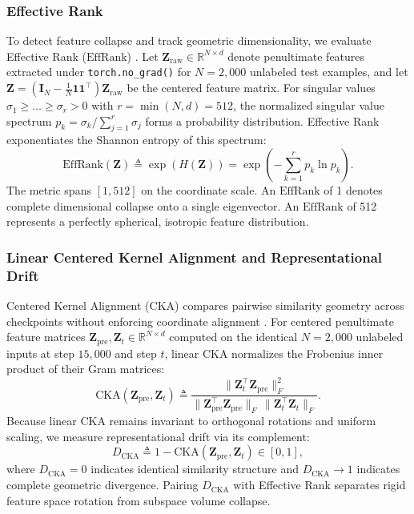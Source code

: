 \documentclass[sn-mathphys,Numbered]{sn-jnl}
\newcommand{\EffRank}{\mathrm{EffRank}}
\newcommand{\Dcka}{D_{\mathrm{CKA}}}
\begin{document}
\subsubsection{Effective Rank}\label{subsubsec:protocol_rank}
To detect feature collapse and track geometric dimensionality, we evaluate Effective Rank ($\EffRank$) \cite{roy2007effective,begga2026preserving}. Let $\bm{Z}_{\mathrm{raw}} \in \mathbb{R}^{N \times d}$ denote penultimate features extracted under \texttt{torch.no\_grad()} for $N = 2{,}000$ unlabeled test examples, and let $\bm{Z} = (\bm{I}_N - \frac{1}{N}\bm{1}\bm{1}^\top)\bm{Z}_{\mathrm{raw}}$ be the centered feature matrix. For singular values $\sigma_1 \ge \dots \ge \sigma_r > 0$ with $r = \min(N, d) = 512$, the normalized singular value spectrum $p_k = \sigma_k / \sum_{j=1}^r \sigma_j$ forms a probability distribution. Effective Rank exponentiates the Shannon entropy of this spectrum:
\begin{equation}\label{eq:effrank}
    \EffRank(\bm{Z}) \triangleq \exp(H(\bm{Z})) = \exp\left( -\sum_{k=1}^r p_k \ln p_k \right).
\end{equation}
The metric spans $[1, 512]$ on the coordinate scale. An $\EffRank$ of 1 denotes complete dimensional collapse onto a single eigenvector. An $\EffRank$ of 512 represents a perfectly spherical, isotropic feature distribution.

\subsubsection{Linear Centered Kernel Alignment and Representational Drift}\label{subsubsec:protocol_cka}
Centered Kernel Alignment (CKA) compares pairwise similarity geometry across checkpoints without enforcing coordinate alignment \cite{kornblith2019similarity}. For centered penultimate feature matrices $\bm{Z}_{\mathrm{pre}}, \bm{Z}_t \in \mathbb{R}^{N \times d}$ computed on the identical $N = 2{,}000$ unlabeled inputs at step $15{,}000$ and step $t$, linear CKA normalizes the Frobenius inner product of their Gram matrices:
\begin{equation}
    \mathrm{CKA}(\bm{Z}_{\mathrm{pre}}, \bm{Z}_t) \triangleq \frac{\|\bm{Z}_t^\top \bm{Z}_{\mathrm{pre}}\|_F^2}{\|\bm{Z}_{\mathrm{pre}}^\top \bm{Z}_{\mathrm{pre}}\|_F \, \|\bm{Z}_t^\top \bm{Z}_t\|_F}.
\end{equation}
Because linear CKA remains invariant to orthogonal rotations and uniform scaling, we measure representational drift via its complement:
\begin{equation}\label{eq:dcka}
    \Dcka \triangleq 1 - \mathrm{CKA}(\bm{Z}_{\mathrm{pre}}, \bm{Z}_t) \in [0, 1],
\end{equation}
where $\Dcka = 0$ indicates identical similarity structure and $\Dcka \to 1$ indicates complete geometric divergence. Pairing $\Dcka$ with Effective Rank separates rigid feature space rotation from subspace volume collapse.
\end{document}

